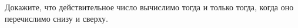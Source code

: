 Докажите, что действительное число вычислимо тогда и только тогда, когда оно перечислимо снизу и сверху.